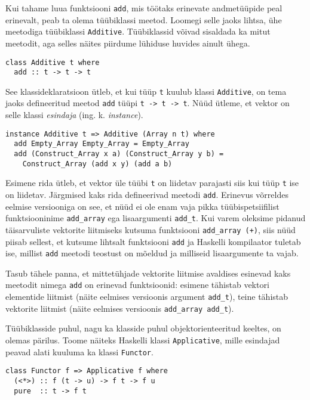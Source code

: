 \documentclass[12pt]{article}
\begin{document}
      Kui tahame luua funktsiooni \verb!add!, mis töötaks erinevate andmetüüpide peal erinevalt, peab ta olema tüübiklassi meetod. Loomegi selle jaoks lihtsa, ühe meetodiga tüübiklassi \verb!Additive!. Tüübiklassid võivad sisaldada ka mitut meetodit, aga selles näites piirdume lühiduse huvides ainult ühega.

      \begin{verbatim}class Additive t where
  add :: t -> t -> t\end{verbatim}

      See klassideklaratsioon ütleb, et kui tüüp \verb!t! kuulub klassi \verb!Additive!, on tema jaoks defineeritud meetod \verb!add! tüüpi \verb!t -> t -> t!. Nüüd ütleme, et vektor on selle klassi \textit{esindaja} (ing. k. \textit{instance}).

      \begin{verbatim}instance Additive t => Additive (Array n t) where
  add Empty_Array Empty_Array = Empty_Array
  add (Construct_Array x a) (Construct_Array y b) =
    Construct_Array (add x y) (add a b)\end{verbatim}

      Esimene rida ütleb, et vektor üle tüübi \verb!t! on liidetav parajasti siis kui tüüp \verb!t! ise on liidetav. Järgmised kaks rida defineerivad meetodi \verb!add!. Erinevus võrreldes eelmise versiooniga on see, et nüüd ei ole enam vaja pikka tüübispetsiifilist funktsiooninime \verb!add_array! ega lisaargumenti \verb!add_t!. Kui varem oleksime pidanud täisarvuliste vektorite liitmiseks kutsuma funktsiooni \verb!add_array (+)!, siis nüüd piisab sellest, et kutsume lihtsalt funktsiooni \verb!add! ja Haskelli kompilaator tuletab ise, millist \verb!add! meetodi teostust on mõeldud ja milliseid lisaargumente ta vajab.

      Tasub tähele panna, et mittetühjade vektorite liitmise avaldises esinevad kaks meetodit nimega \verb!add! on erinevad funktsioonid: esimene tähistab vektori elementide liitmist (näite eelmises versioonis argument \verb!add_t!), teine tähistab vektorite liitmist (näite eelmises versioonis \verb!add_array add_t!).

      Tüübiklasside puhul, nagu ka klasside puhul objektorienteeritud keeltes, on olemas pärilus. Toome näiteks Haskelli klassi \verb!Applicative!, mille esindajad peavad alati kuuluma ka klassi \verb!Functor!.

      \begin{verbatim}class Functor f => Applicative f where
  (<*>) :: f (t -> u) -> f t -> f u
  pure  :: t -> f t\end{verbatim}
\end{document}
